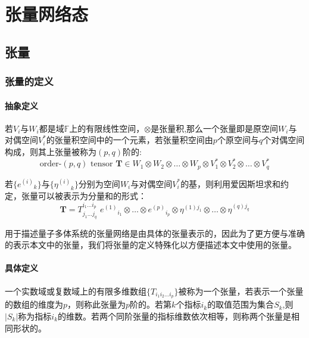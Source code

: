 
\chapter{张量网络态}

\section{张量}

\subsection{张量的定义}

\subsubsection{抽象定义}

若$V_i$与$W_i$都是域$\mathbb{F}$上的有限线性空间，$\otimes$是张量积,那么一个张量即是原空间$W_i$与对偶空间$V^*_i$的张量积空间中的一个元素，若张量积空间由$p$个原空间与$q$个对偶空间构成，则其上张量被称为$(p,q)$阶的:
\[
\text{order-}(p,q) \text{ tensor } \symbf{T} \in W_1 \otimes W_2 \otimes \dots \otimes W_p 
\otimes V^*_1 \otimes V^*_2 \otimes \dots \otimes V^*_q
\]

若$\{{e^{(i)}}_k\}$与$\{{\eta^{(i)}}_k\}$分别为空间$W_i$与对偶空间$V^*_i$的基，则利用爱因斯坦求和约定，张量可以被表示为分量和的形式：
\[
\symbf{T}=T^{i_1\dots i_p}_{j_1\dots j_q} \,\, {e^{(1)}}_{i_1}\otimes\dots\otimes{e^{(p)}}_{i_p}
\otimes {\eta^{(1)j_1}}\otimes\dots\otimes{\eta^{(q)j_q}}
\]

用于描述量子多体系统的张量网络是由具体的张量表示的，因此为了更方便与准确的表示本文中的张量，我们将张量的定义特殊化以方便描述本文中使用的张量。

\subsubsection{具体定义}

一个实数域或复数域上的有限多维数组$\{T_{i_1 i_2\dots i_p}\}$被称为一个张量，若表示一个张量的数组的维度为$p$，则称此张量为$p$阶的。若第$k$个指标$i_k$的取值范围为集合$S_{k}$,则$\lvert S_{k}\rvert$称为指标$i_k$的维数。若两个同阶张量的指标维数依次相等，则称两个张量是相同形状的。

